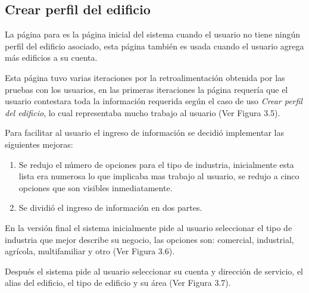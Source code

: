 

\subsection{Crear perfil del edificio}

La página para  es la página inicial del
sistema cuando el usuario no tiene ningún perfil del edificio asociado, esta página
también es usada cuando el usuario agrega más edificios a su cuenta.

Esta página tuvo varias iteraciones por la retroalimentación obtenida por las
pruebas con los usuarios, en las primeras iteraciones la página requería que el
usuario contestara toda la información requerida según el caso de uso
\textit{Crear perfil del edificio}, lo cual representaba mucho trabajo al usuario
(Ver Figura 3.5).


Para facilitar al usuario el ingreso de información se decidió implementar
las siguientes mejoras:

\begin{enumerate}
\item Se redujo el número de opciones para el tipo de industria, inicialmente
  esta lista era numerosa lo que implicaba mas trabajo al usuario, se redujo
  a cinco opciones que son visibles inmediatamente.
\item Se dividió el ingreso de información en dos partes.
\end{enumerate}

En la versión final el sistema inicialmente pide al usuario seleccionar el tipo
de industria que mejor describe su negocio, las opciones son: comercial, industrial,
agrícola, multifamiliar y otro (Ver Figura 3.6).


Después el sistema pide al usuario seleccionar su cuenta y dirección
de servicio, el alias del edificio, el tipo de edificio y su área
(Ver Figura 3.7).


